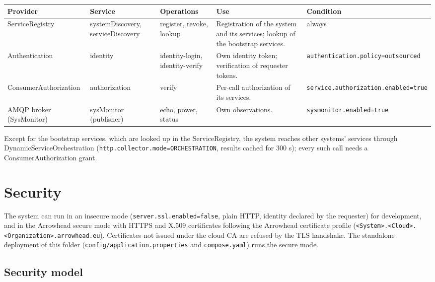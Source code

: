 \documentclass[a4paper]{arrowhead}
\begin{document}
\noindent\begin{longtable}{| >{\raggedright\arraybackslash}p{2.9cm} | >{\raggedright\arraybackslash}p{3.1cm} | >{\raggedright\arraybackslash}p{2.5cm} | p{3.6cm} | >{\raggedright\arraybackslash}p{2.9cm} |} \hline
\rowcolor{gray!33} Provider & Service & Operations & Use & Condition \\ \hline \endhead
ServiceRegistry & systemDiscovery, serviceDiscovery & register, revoke, lookup & Registration of the system and its services; lookup of the bootstrap services. & always \\ \hline
Authentication & identity & identity-login, identity-verify & Own identity token; verification of requester tokens. & \texttt{authentication.\allowbreak{}policy=\allowbreak{}outsourced} \\ \hline
Consumer\allowbreak{}Authorization & authorization & verify & Per-call authorization of its services. & \texttt{service.\allowbreak{}authorization.\allowbreak{}enabled=\allowbreak{}true} \\ \hline
AMQP broker (SysMonitor) & sysMonitor (publisher) & echo, power, status & Own observations. & \texttt{sysmonitor.\allowbreak{}enabled=\allowbreak{}true} \\ \hline
\end{longtable}

Except for the bootstrap services, which are looked up in the ServiceRegistry, the system reaches other systems' services through DynamicServiceOrchestration (\texttt{http.collector.mode=ORCHESTRATION}, results cached for 300 s); every such call needs a ConsumerAuthorization grant.

\newpage

\section{Security}
\label{sec:security}

The system can run in an insecure mode (\texttt{server.ssl.enabled=false}, plain HTTP, identity declared by the requester) for development, and in the Arrowhead secure mode with HTTPS and X.509 certificates following the Arrowhead certificate profile (\texttt{<System>.<Cloud>.<Organization>.arrowhead.eu}). Certificates not issued under the cloud CA are refused by the TLS handshake. The standalone deployment of this folder (\texttt{config/\allowbreak{}application.\allowbreak{}properties} and \texttt{compose.yaml}) runs the secure mode.

\subsection{Security model}
\end{document}
